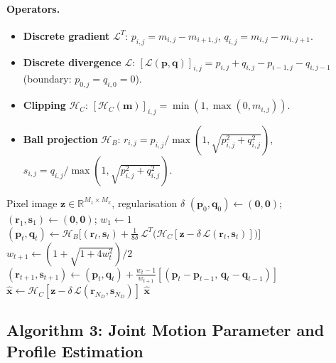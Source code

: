 \documentclass[11pt,a4paper]{article}
\newcommand{\R}{\mathbb{R}}
\begin{document}
\paragraph{Operators.}
\begin{itemize}
  \item \textbf{Discrete gradient}
    $\mathcal{L}^T$:
    $p_{i,j}=m_{i,j}{-}m_{i+1,j}$,\;
    $q_{i,j}=m_{i,j}{-}m_{i,j+1}$.
  \item \textbf{Discrete divergence}
    $\mathcal{L}$:
    $[\mathcal{L}(\mathbf{p},\mathbf{q})]_{i,j}
    = p_{i,j}{+}q_{i,j}{-}p_{i-1,j}{-}q_{i,j-1}$
    (boundary: $p_{0,j}{=}q_{i,0}{=}0$).
  \item \textbf{Clipping}
    $\mathcal{H}_C$:
    $[\mathcal{H}_C(\mathbf{m})]_{i,j}=\min(1,\max(0,m_{i,j}))$.
  \item \textbf{Ball projection}
    $\mathcal{H}_B$:
    $r_{i,j}=p_{i,j}/\max(1,\sqrt{p_{i,j}^2{+}q_{i,j}^2})$,\;
    $s_{i,j}=q_{i,j}/\max(1,\sqrt{p_{i,j}^2{+}q_{i,j}^2})$.
\end{itemize}

\begin{algorithm}[H]
\caption{TV denoising:
$\mathrm{prox}_{\mathcal{R}}(\mathbf{z},\delta)$}
\label{alg:tv_denoise}
\begin{algorithmic}[1]
\Require Pixel image $\mathbf{z}\in\R^{M_z\times M_x}$,
regularisation $\delta$
\State $(\mathbf{p}_0,\mathbf{q}_0)\leftarrow(\mathbf{0},\mathbf{0})$;
$(\mathbf{r}_1,\mathbf{s}_1)\leftarrow(\mathbf{0},\mathbf{0})$;
$w_1\leftarrow 1$
  \State $(\mathbf{p}_t,\mathbf{q}_t) \leftarrow
    \mathcal{H}_B\!\bigl[(\mathbf{r}_t,\mathbf{s}_t)
    + \tfrac{1}{8\delta}\,\mathcal{L}^T\!\bigl(
    \mathcal{H}_C[\mathbf{z}{-}\delta\,
    \mathcal{L}(\mathbf{r}_t,\mathbf{s}_t)]\bigr)\bigr]$
  \State $w_{t+1}\leftarrow(1{+}\sqrt{1{+}4w_t^2})/2$
  \State $(\mathbf{r}_{t+1},\mathbf{s}_{t+1})\leftarrow
    (\mathbf{p}_t,\mathbf{q}_t)
    +\tfrac{w_t-1}{w_{t+1}}
    [(\mathbf{p}_t{-}\mathbf{p}_{t-1},\,
    \mathbf{q}_t{-}\mathbf{q}_{t-1})]$
\EndFor
\State $\hat{\mathbf{x}}\leftarrow
  \mathcal{H}_C[\mathbf{z}{-}\delta\,
  \mathcal{L}(\mathbf{r}_{N_D},\mathbf{s}_{N_D})]$
\State \Return $\hat{\mathbf{x}}$
\end{algorithmic}
\end{algorithm}

\subsection{Algorithm 3: Joint Motion Parameter and Profile Estimation}
\label{sec:alg3}
\end{document}
